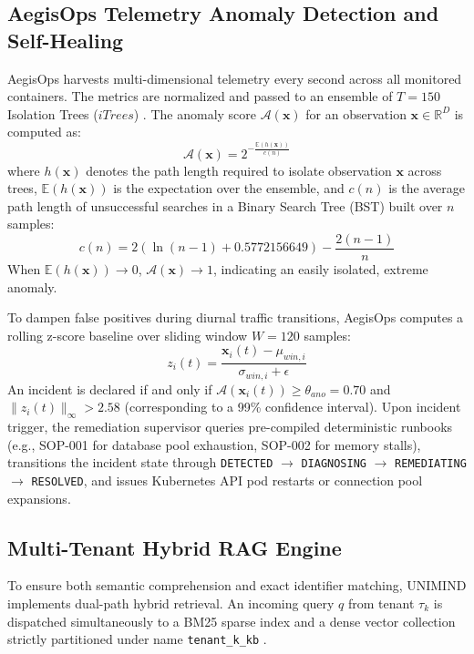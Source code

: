 \documentclass[12pt,onecolumn,draftclsnofoot]{IEEEtran}
\begin{document}
\subsection{AegisOps Telemetry Anomaly Detection and Self-Healing}
AegisOps harvests multi-dimensional telemetry every second across all monitored containers. The metrics are normalized and passed to an ensemble of $T = 150$ Isolation Trees ($iTrees$) \cite{liu2008isolation}. The anomaly score $\mathcal{A}(\mathbf{x})$ for an observation $\mathbf{x} \in \mathbb{R}^D$ is computed as:
\begin{equation}
\mathcal{A}(\mathbf{x}) = 2^{-\frac{\mathbb{E}(h(\mathbf{x}))}{c(n)}}
\end{equation}
where $h(\mathbf{x})$ denotes the path length required to isolate observation $\mathbf{x}$ across trees, $\mathbb{E}(h(\mathbf{x}))$ is the expectation over the ensemble, and $c(n)$ is the average path length of unsuccessful searches in a Binary Search Tree (BST) built over $n$ samples:
\begin{equation}
c(n) = 2 \left( \ln(n - 1) + 0.5772156649 \right) - \frac{2(n - 1)}{n}
\end{equation}
When $\mathbb{E}(h(\mathbf{x})) \to 0$, $\mathcal{A}(\mathbf{x}) \to 1$, indicating an easily isolated, extreme anomaly.

To dampen false positives during diurnal traffic transitions, AegisOps computes a rolling z-score baseline over sliding window $W = 120$ samples:
\begin{equation}
z_i(t) = \frac{\mathbf{x}_i(t) - \mu_{win,i}}{\sigma_{win,i} + \epsilon}
\end{equation}
An incident is declared if and only if $\mathcal{A}(\mathbf{x}_i(t)) \ge \theta_{ano} = 0.70$ and $\|z_i(t)\|_\infty > 2.58$ (corresponding to a 99\% confidence interval). Upon incident trigger, the remediation supervisor queries pre-compiled deterministic runbooks (e.g., SOP-001 for database pool exhaustion, SOP-002 for memory stalls), transitions the incident state through \texttt{DETECTED} $\to$ \texttt{DIAGNOSING} $\to$ \texttt{REMEDIATING} $\to$ \texttt{RESOLVED}, and issues Kubernetes API pod restarts or connection pool expansions.

\subsection{Multi-Tenant Hybrid RAG Engine}
To ensure both semantic comprehension and exact identifier matching, UNIMIND implements dual-path hybrid retrieval. An incoming query $q$ from tenant $\tau_k$ is dispatched simultaneously to a BM25 sparse index and a dense vector collection strictly partitioned under name \texttt{tenant\_k\_kb} \cite{lewis2020retrieval, robertson2009probabilistic}.
\end{document}
